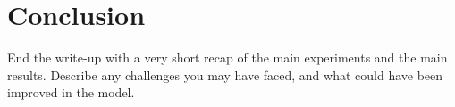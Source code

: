 \documentclass[11pt]{article}
\begin{document}


\section{Conclusion}

End the write-up with a very short recap of the main experiments and the main
results. Describe any challenges you may have faced, and what could have been
improved in the model.



\end{document}
